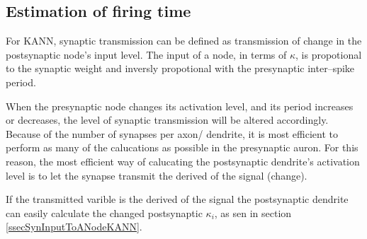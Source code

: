 




	\subsection{Estimation of firing time}
	For KANN, synaptic transmission can be defined as transmission of change in the postsynaptic node's input level.
	The input of a node, in terms of $\kappa$, is propotional to the synaptic weight and inversly propotional with the presynaptic inter--spike period.

	When the presynaptic node changes its activation level, and its period increases or decreases, the level of synaptic transmission will be altered accordingly. 
	Because of the number of synapses per axon/ dendrite, it is most efficient to perform as many of the calucations as possible in the presynaptic auron.
	For this reason, the most efficient way of calucating the postsynaptic dendrite's activation level is to let the synapse transmit the derived of the signal (change).

	If the transmitted varible is the derived of the signal the postsynaptic dendrite can easily calculate the changed postsynaptic $\kappa_i$, as sen in section \ref{ssecSynInputToANodeKANN}.
	
